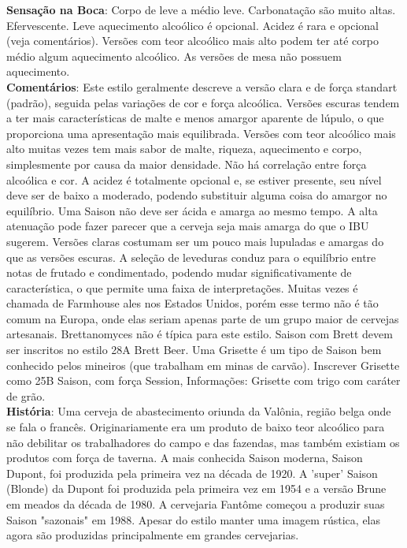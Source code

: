 \textbf{Sensação na Boca}: Corpo de leve a médio leve. Carbonatação são muito altas. Efervescente. Leve aquecimento alcoólico é opcional. Acidez é rara e opcional (veja comentários). Versões com teor alcoólico mais alto podem ter até corpo médio algum aquecimento alcoólico. As versões de mesa não possuem aquecimento. \\
\textbf{Comentários}: Este estilo geralmente descreve a versão clara e de força standart (padrão), seguida pelas variações de cor e força alcoólica. Versões escuras tendem a ter mais características de malte e menos amargor aparente de lúpulo, o que proporciona uma apresentação mais equilibrada. Versões com teor alcoólico mais alto muitas vezes tem mais sabor de malte, riqueza, aquecimento e corpo, simplesmente por causa da maior densidade. Não há correlação entre força alcoólica e cor. A acidez é totalmente opcional e, se estiver presente, seu nível deve ser de baixo a moderado, podendo substituir alguma coisa do amargor no equilíbrio. Uma Saison não deve ser ácida e amarga ao mesmo tempo. A alta atenuação pode fazer parecer que a cerveja seja mais amarga do que o IBU sugerem. Versões claras costumam ser um pouco mais lupuladas e amargas do que as versões escuras. A seleção de leveduras conduz para o equilíbrio entre notas de frutado e condimentado, podendo mudar significativamente de característica, o que permite uma faixa de interpretações. Muitas vezes é chamada de Farmhouse ales nos Estados Unidos, porém esse termo não é tão comum na Europa, onde elas seriam apenas parte de um grupo maior de cervejas artesanais. Brettanomyces não é típica para este estilo. Saison com Brett devem ser inscritos no estilo 28A Brett Beer. Uma Grisette é um tipo de Saison bem conhecido pelos mineiros (que trabalham em minas de carvão). Inscrever Grisette como 25B Saison, com força Session, Informações: Grisette com trigo com caráter de grão. \\
\textbf{História}: Uma cerveja de abastecimento oriunda da Valônia, região belga onde se fala o francês. Originariamente era um produto de baixo teor alcoólico para não debilitar os trabalhadores do campo e das fazendas, mas também existiam os produtos com força de taverna. A mais conhecida Saison moderna, Saison Dupont, foi produzida pela primeira vez na década de 1920. A 'super' Saison (Blonde) da Dupont foi produzida pela primeira vez em 1954 e a versão Brune em meados da década de 1980. A cervejaria Fantôme começou a produzir suas Saison "sazonais" em 1988. Apesar do estilo manter uma imagem rústica, elas agora são produzidas principalmente em grandes cervejarias. \\
